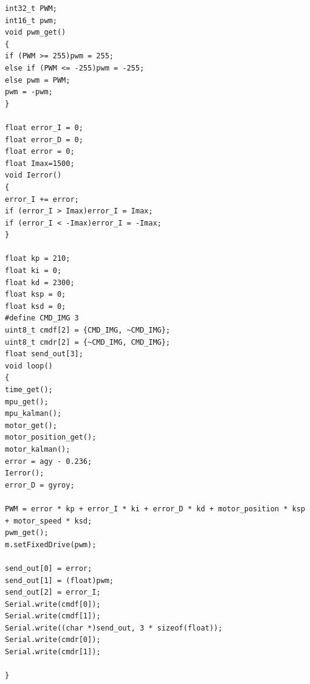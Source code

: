 \documentclass[a4paper]{ctexart}
\begin{document}
\begin{appendices}
\begin{lstlisting}
int32_t PWM;
int16_t pwm;
void pwm_get()
{
if (PWM >= 255)pwm = 255;
else if (PWM <= -255)pwm = -255;
else pwm = PWM;
pwm = -pwm;
}

float error_I = 0;
float error_D = 0;
float error = 0;
float Imax=1500;
void Ierror()
{
error_I += error;
if (error_I > Imax)error_I = Imax;
if (error_I < -Imax)error_I = -Imax;
}

float kp = 210;
float ki = 0;
float kd = 2300;
float ksp = 0;
float ksd = 0;
#define CMD_IMG 3
uint8_t cmdf[2] = {CMD_IMG, ~CMD_IMG};
uint8_t cmdr[2] = {~CMD_IMG, CMD_IMG};
float send_out[3];
void loop()
{
time_get();
mpu_get();
mpu_kalman();
motor_get();
motor_position_get();
motor_kalman();
error = agy - 0.236;
Ierror();
error_D = gyroy;

PWM = error * kp + error_I * ki + error_D * kd + motor_position * ksp + motor_speed * ksd;
pwm_get();
m.setFixedDrive(pwm);

send_out[0] = error;
send_out[1] = (float)pwm;
send_out[2] = error_I;
Serial.write(cmdf[0]);
Serial.write(cmdf[1]);
Serial.write((char *)send_out, 3 * sizeof(float));
Serial.write(cmdr[0]);
Serial.write(cmdr[1]);

}
\end{lstlisting}
\end{appendices}
\end{document}
